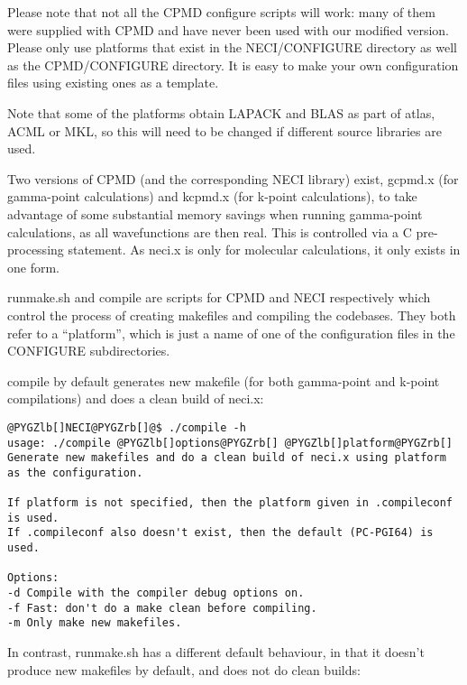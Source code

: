 \documentclass[openany,a4paper,10pt,english]{manual}
\begin{document}
Please note that not all the CPMD configure scripts will work: many of
them were supplied with CPMD and have never been used with our modified
version.  Please only use platforms that exist in the NECI/CONFIGURE
directory as well as the CPMD/CONFIGURE directory.  It is easy to make
your own configuration files using existing ones as a template.

Note that some of the platforms obtain LAPACK and BLAS as part of atlas,
ACML or MKL, so this will need to be changed if different source libraries
are used.

Two versions of CPMD (and the corresponding NECI library) exist, gcpmd.x
(for gamma-point calculations) and kcpmd.x (for k-point calculations),
to take advantage of some substantial memory savings when running
gamma-point calculations, as all wavefunctions are then real.  This is
controlled via a C pre-processing statement.  As neci.x is only for
molecular calculations, it only exists in one form.

runmake.sh and compile are scripts for CPMD and NECI respectively which
control the process of creating makefiles and compiling the codebases.
They both refer to a ``platform'', which is just a name of one of the
configuration files in the CONFIGURE subdirectories.

compile by default generates new makefile (for both gamma-point and
k-point compilations) and does a clean build of neci.x:

\begin{Verbatim}[commandchars=@\[\]]
@PYGZlb[]NECI@PYGZrb[]@$ ./compile -h
usage: ./compile @PYGZlb[]options@PYGZrb[] @PYGZlb[]platform@PYGZrb[]
Generate new makefiles and do a clean build of neci.x using platform as the configuration.

If platform is not specified, then the platform given in .compileconf is used.
If .compileconf also doesn't exist, then the default (PC-PGI64) is used.

Options:
-d Compile with the compiler debug options on.
-f Fast: don't do a make clean before compiling.
-m Only make new makefiles.
\end{Verbatim}

In contrast, runmake.sh has a different default behaviour, in that it
doesn't produce new makefiles by default, and does not do clean builds:
\end{document}
